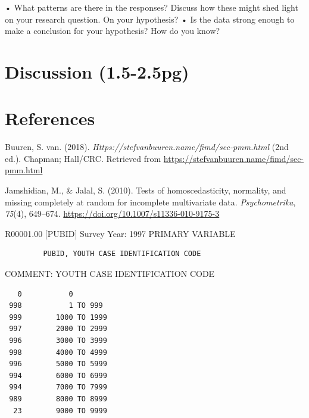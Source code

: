 \documentclass[
  man,floatsintext]{apa6}
\newlength{\cslhangindent}
\newenvironment{CSLReferences}[2] %
 {\begin{list}{}{%
  \setlength{\itemindent}{0pt}
  \setlength{\leftmargin}{0pt}
  \setlength{\parsep}{0pt}
  \ifodd #1
   \setlength{\leftmargin}{\cslhangindent}
   \setlength{\itemindent}{-1\cslhangindent}
  \fi
  \setlength{\itemsep}{#2\baselineskip}}}
 {\end{list}}
\begin{document}
• What patterns are there in the responses? Discuss how these might shed light on your research question. On your hypothesis? • Is the data strong enough to make a conclusion for your hypothesis? How do you know?

\section{Discussion (1.5-2.5pg)}\label{discussion-1.5-2.5pg}

\newpage

\section{References}\label{references}

\label{refs}
\begin{CSLReferences}{1}{0}
Buuren, S. van. (2018). \emph{Https://stefvanbuuren.name/fimd/sec-pmm.html} (2nd ed.). Chapman; Hall/CRC. Retrieved from \url{https://stefvanbuuren.name/fimd/sec-pmm.html}

Jamshidian, M., \& Jalal, S. (2010). Tests of homoscedasticity, normality, and missing completely at random for incomplete multivariate data. \emph{Psychometrika}, \emph{75}(4), 649--674. \url{https://doi.org/10.1007/s11336-010-9175-3}

\end{CSLReferences}

\newpage

\appendix


R00001.00 {[}PUBID{]} Survey Year: 1997
PRIMARY VARIABLE

\begin{verbatim}
         PUBID, YOUTH CASE IDENTIFICATION CODE
\end{verbatim}

COMMENT: YOUTH CASE IDENTIFICATION CODE

\begin{verbatim}
   0           0
 998           1 TO 999
 999        1000 TO 1999
 997        2000 TO 2999
 996        3000 TO 3999
 998        4000 TO 4999
 996        5000 TO 5999
 994        6000 TO 6999
 994        7000 TO 7999
 989        8000 TO 8999
  23        9000 TO 9999
\end{verbatim}
\end{document}
